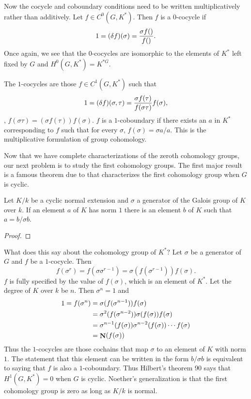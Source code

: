 Now the cocycle and coboundary conditions need to be written
multiplicatively rather than additively.  Let $f \in C^0(G,
K^{\ast})$.  Then $f$ is a $0$-cocycle if
\[
1 = (\delta f)(\sigma) = {\sigma f() \over f()}.
\]
Once again, we see that the $0$-cocycles are isomorphic to the elements
of $K^{\ast}$ left fixed by $G$ and $H^0(G, K^{\ast}) = K^{\ast G}$.

The $1$-cocycles are those 
$f \in C^1(G, K^{\ast})$ such that
\[
1 = (\delta f)(\sigma, \tau) 
    = {\sigma f(\tau) \over f(\sigma\tau)} f(\sigma),
\]
\ie, $f(\sigma\tau) = (\sigma f(\tau)) f(\sigma).$
$f$ is a $1$-coboundary if there exists an $a$ in $K^{\ast}$
corresponding to $f$ such that for every $\sigma$, $f(\sigma) = \sigma a / a$.
This is the multiplicative formulation of group cohomology.

Now that we have complete characterizations of the zeroth cohomology
groups, our next problem is to study the first cohomology groups.  The
first major result is a famous theorem due to {\Hilbert}
\cite{Hilbert1897-zn} that characterizes the first cohomology group when
$G$ is cyclic.

\begin{proposition}
\label{Hilbert:Ninety:Prop}
Let $K/k$ be a cyclic normal extension and $\sigma$ a generator of the
Galois group of $K$ over $k$.  If an element $a$ of $K$ has norm $1$
there is an element $b$ of $K$ such that $a= b/\sigma b$.
\end{proposition}

\begin{proof}
\end{proof}

What does this say about the cohomology group of $K^{\ast}$?
Let $\sigma$ be a generator of $G$ and $f$ be a $1$-cocycle.  Then
\[
f(\sigma^r) = f(\sigma \sigma^{r-1}) = \sigma(f(\sigma^{r-1}))
f(\sigma).
\]
$f$ is fully specified by the value of $f(\sigma)$, which is an element
of $K^{\ast}$.  Let the degree of $K$ over $k$ be $n$.  Then 
$\sigma^n = 1$ and
\[
\begin{aligned}
1 = f(\sigma^n) &= \sigma(f(\sigma^{n-1})) f(\sigma) \\
&= \sigma^2(f(\sigma^{n-2})) \sigma(f(\sigma)) f(\sigma) \\
& = \sigma^{n-1}(f(\sigma)) \sigma^{n-2}(f(\sigma)) \cdots f(\sigma)\\
& = \mathop{\mathbf{N}}\nolimits(f(\sigma))
\end{aligned}
\]
Thus the $1$-cocycles are those cochains that map $\sigma$ to an element
of $K$ with norm $1$.  The statement that this element can be written in
the form $b / \sigma b$ is equivalent to saying that $f$ is also a
$1$-coboundary.  Thus Hilbert's theorem 90 says that $H^1(G, K^{\ast}) =
0$ when $G$ is cyclic.  Noether's generalization is that the first
cohomology group is zero as long as $K/k$ is normal.

